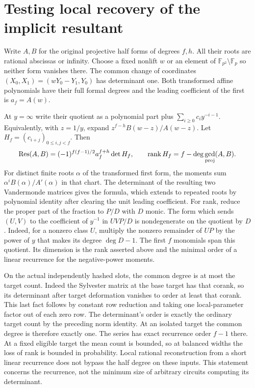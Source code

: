 \documentclass[11pt]{article}
\newcommand{\F}{\mathbb F}
\newcommand{\Res}{\operatorname{Res}}
\begin{document}
\section{Testing local recovery of the implicit resultant}
Write $A,B$ for the original projective half forms of degrees $f,h$.
All their roots are rational abscissas or infinity. Choose a fixed
nonlift $w$ or an element of $\F_{p^2}\setminus\F_p$ so neither
form vanishes there. The common change of coordinates
$(X_0,X_1)=(wY_0-Y_1,Y_0)$ has determinant one. Both transformed
affine polynomials have their full formal degrees and the leading
coefficient of the first is $a_f=A(w)$.

At $y=\infty$ write their quotient as a polynomial part plus
$\sum_{i\ge0}c_i y^{-i-1}$. Equivalently, with $z=1/y$, expand
$z^{f-h}B(w-z)/A(w-z)$. Let $H_f=(c_{i+j})_{0\le i,j<f}$. Then
\[
 \Res(A,B)=(-1)^{f(f-1)/2}a_f^{f+h}\det H_f,\qquad
 \operatorname{rank} H_f=f-\deg\gcd_{\rm proj}(A,B).
\]
For distinct finite roots $\alpha$ of the transformed first form,
the moments sum $\alpha^i B(\alpha)/A'(\alpha)$ in that chart.
The determinant of the resulting two Vandermonde matrices gives
the formula, which extends to repeated roots by polynomial identity
after clearing the unit leading coefficient. For rank, reduce the
proper part of the fraction to $P/D$ with $D$ monic. The form which
sends $(U,V)$ to the coefficient of $y^{-1}$ in $UVP/D$ is
nondegenerate on the quotient by $D$. Indeed, for a nonzero class $U$,
multiply the nonzero remainder of $UP$ by the power of $y$ that makes its degree $\deg D-1$.
The first $f$ monomials span this quotient. Its dimension is the
rank asserted above and the minimal order of a linear recurrence
for the negative-power moments.

On the actual independently hashed slots, the common degree is
at most the target count. Indeed the Sylvester matrix at the base
target has that corank, so its determinant after target deformation
vanishes to order at least that corank. This last fact follows by
constant row reduction and taking one local-parameter factor out
of each zero row. The determinant's order is exactly the ordinary
target count by the preceding norm identity. At an isolated target
the common degree is therefore exactly one. The series has exact
recurrence order $f-1$ there. At a fixed eligible target the mean
count is bounded, so at balanced widths the loss of rank is bounded
in probability. Local rational reconstruction from a short linear
recurrence does not bypass the half degree on these inputs.
This statement concerns the recurrence, not the minimum size of
arbitrary circuits computing its determinant.
\end{document}

